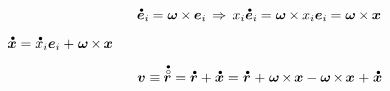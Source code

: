 \begin{otherlanguage}{russian}
~

\nopagebreak\vspace{-0.2em}\begin{equation*}
\mathdotabove{\bm{e}}_i \hspace{-0.1ex} = \bm{\omega} \hspace{-0.1ex} \times \hspace{-0.1ex} \bm{e}_i
\hspace{.33ex} \Rightarrow \hspace{.4ex}
x_i \mathdotabove{\bm{e}}_i \hspace{-0.1ex} = \bm{\omega} \hspace{-0.1ex} \times \hspace{-0.1ex} x_i \bm{e}_i \hspace{-0.1ex}
= \bm{\omega} \hspace{-0.1ex} \times \hspace{-0.1ex} \bm{x}
\end{equation*}

${
\mathdotabove{\bm{x}} = \mathdotabove{x}_i \bm{e}_i + \hspace{.1ex} \bm{\omega} \hspace{-0.16ex} \times \hspace{-0.16ex} \bm{x}
}$

\begin{equation*}
\bm{v} \equiv \hspace{-0.1ex} \mathdotabove{\initiallocationvector} = \mathdotabove{\locationvector} + \mathdotabove{\bm{x}}
= \hspace{-0.2ex} \tikzmark{beginEVelocity} \hspace{.25ex} \mathdotabove{\locationvector} \hspace{.1ex} + \hspace{.1ex} \bm{\omega} \hspace{-0.2ex} \times \hspace{-0.2ex} \bm{x} \tikzmark{endEVelocity}
\hspace{.4ex} \tikzmark{beginRelativeVelocity} \hspace{-0.4ex} - \bm{\omega} \hspace{-0.2ex} \times \hspace{-0.2ex} \bm{x} \hspace{.1ex} + \hspace{.1ex} \mathdotabove{\bm{x}} \hspace{-0.33ex} \tikzmark{endRelativeVelocity}
\end{equation*}%


\end{otherlanguage}

